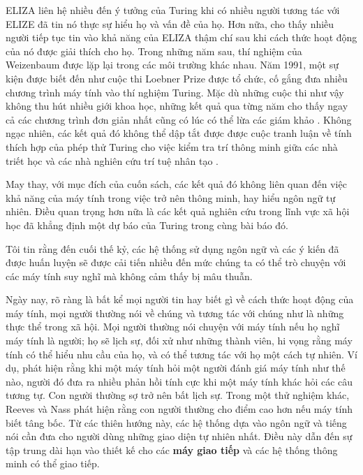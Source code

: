 ELIZA liên hệ nhiều đến ý tưởng của Turing khi có nhiều người tương tác với ELIZE đã tin nó thực sự hiểu họ và vấn đề của họ. Hơn nữa, \citet{weizenbaum1976computer} cho thấy nhiều người tiếp tục tin vào khả năng của ELIZA thậm chí sau khi cách thức hoạt động của nó được giải thích cho họ. Trong những năm sau, thí nghiệm của Weizenbaum được lặp lại trong các môi trường khác nhau. Năm 1991, một sự kiện được biết đến như cuộc thi Loebner Prize được tổ chức, cố gắng đưa nhiều chương trình máy tính vào thí nghiệm Turing. Mặc dù những cuộc thi như vậy không thu hút nhiều giới khoa học, những kết quả qua từng năm cho thấy ngay cả các chương trình đơn giản nhất cũng có lúc có thể lừa các giám khảo \citep{shieber1994lessons}. Không ngạc nhiên, các kết quả đó không thể dập tắt được được cuộc tranh luận về tính thích hợp của phép thử Turing cho việc kiểm tra trí thông minh giữa các nhà triết học và các nhà nghiên cứu trí tuệ nhân tạo \citep{searle1980minds}.

May thay, với mục đích của cuốn sách, các kết quả đó không liên quan đến việc khả năng của máy tính trong việc trở nên thông minh, hay hiểu ngôn ngữ tự nhiên. Điều quan trọng hơn nữa là các kết quả nghiên cứu trong lĩnh vực xã hội học đã khẳng định một dự báo của Turing trong cùng bài báo đó.

\begin{adjustwidth}{1.5cm}{}
Tôi tin rằng đến cuối thế kỷ, các hệ thống sử dụng ngôn ngữ và các ý kiến đã được huấn luyện sẽ được cải tiến nhiều đến mức chúng ta có thể trò chuyện với các máy tính suy nghĩ mà không cảm thấy bị mâu thuẫn.
\end{adjustwidth}

Ngày nay, rõ ràng là bất kể mọi người tin hay biết gì về cách thức hoạt động của máy tính, mọi người thường nói về chúng và tương tác với chúng như là những thực thể trong xã hội. Mọi người thường nói chuyện với máy tính nếu họ nghĩ máy tính là người; họ sẽ lịch sự, đối xử như những thành viên, hi vọng rằng máy tính có thể hiểu nhu cầu của họ, và có thể tương tác với họ một cách tự nhiên. Ví dụ, \citet*{reeves1996media} phát hiện rằng khi một máy tính hỏi một người đánh giá máy tính như thế nào, người đó đưa ra nhiều phản hồi tính cực khi một máy tính khác hỏi các câu tương tự. Con người thường sợ trở nên bất lịch sự. Trong một thử nghiệm khác, Reeves và Nass phát hiện rằng con người thường cho điểm cao hơn nếu máy tính biết tâng bốc. Từ các thiên hướng này, các hệ thống dựa vào ngôn ngữ và tiếng nói cần đưa cho người dùng những giao diện tự nhiên nhất. Điều này dẫn đến sự tập trung dài hạn vào thiết kế cho các \textbf{máy giao tiếp} và các hệ thống thông minh có thể giao tiếp.

